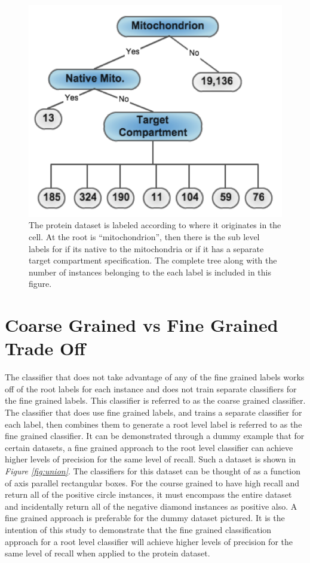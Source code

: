 \documentclass[ms]{nuthesis}
\begin{document}
\FloatBarrier
\begin{figure}[!htb]
	\centering
    \includegraphics[width=0.5\columnwidth]{fig/Mito_tree}
    \caption{The protein dataset is labeled according to where it originates in the cell. At the
    root is “mitochondrion”, then there is the sub level labels for if its native to the mitochondria
    or if it has a separate target compartment specification. The complete tree along with the number
    of instances belonging to the each label is included in this figure.}
    \label{fig:Mitotree}
\end{figure}
\FloatBarrier

\section{Coarse Grained vs Fine Grained Trade Off}
\par The classifier that does not take advantage of any of the fine grained labels works off of the root
labels for each instance and does not train separate classifiers for the fine grained labels. This
classifier is referred to as the coarse grained classifier. The classifier that does use fine grained
labels, and trains a separate classifier for each label, then combines them to generate a root level
label is referred to as the fine grained classifier. It can be demonstrated through a dummy example
that for certain datasets, a fine grained approach to the root level classifier can achieve higher
levels of precision for the same level of recall. Such a dataset is shown in \textit{Figure
\ref{fig:union}}. The classifiers for this dataset can be thought of as a function of axis parallel rectangular boxes.
For the course grained to have high recall and return all of the positive circle instances, it must
encompass the entire dataset and incidentally return all of the negative diamond instances as
positive also. A fine grained approach is preferable for the dummy dataset pictured. It is the
intention of this study to demonstrate that the fine grained classification approach for a root
level classifier will achieve higher levels of precision for the same level of recall when
applied to the protein dataset.
\end{document}
